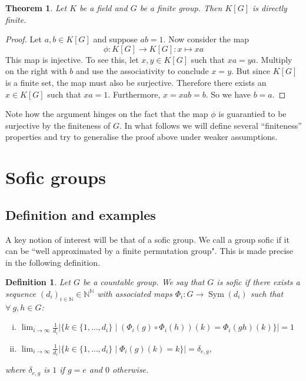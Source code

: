 \documentclass[titlepage, a4paper]{article}
\newcommand{\N}{\mathbb{N}}
\newcommand{\card}[1]{\left| #1 \right|}
\DeclareMathOperator{\sym}{Sym}
\newtheorem{theorem}{Theorem}
\newtheorem{definition}{Definition}
\theoremstyle{remark}
\begin{document}
\begin{theorem}
    Let $K$ be a field and $G$ be a finite group. Then $K[G]$ is directly finite.
\end{theorem}
\begin{proof}
    Let $a, b \in K[G]$ and suppose $ab=1$. Now consider the map
    \[
        \phi: K[G] \to K[G]: x \mapsto x a
    \]
    This map is injective. To see this, let $x, y \in K[G]$ such that $xa=ya$. Multiply on the right with $b$ and use the associativity to conclude $x=y$.
    But since $K[G]$ is a finite set, the map must also be surjective. Therefore there exists an $x \in K[G]$ such that $x a = 1$. Furthermore, $x = xab = b$. So we have $b=a$.
\end{proof}

Note how the argument hinges on the fact that the map $\phi$ is guarantied to be surjective by the finiteness of $G$. In what follows we will define several ``finiteness'' properties and try to generalise the proof above under weaker assumptions.

\section{Sofic groups}\label{sec:sofic_group}

\subsection{Definition and examples}

    A key notion of interest will be that of a sofic group. We call a group sofic if it can be ``well approximated by a finite permutation group". This is made precise in the following definition.

    \begin{definition}\label{def:Sofic}
        Let $G$ be a countable group. We say that $G$ is sofic if there exists a sequence $(d_i)_{i \in \N} \in \N ^{\N}$ with associated maps $\Phi_i : G \to \sym(d_i)$ such that $\forall\ g, h \in G$:
        \begin{enumerate}[(i)]
            \item $\displaystyle \lim_{i\to \infty} \frac{1}{d_i} \card{\big\{k \in \{1, \dots, d_i\} \mid (\Phi_i(g) \circ \Phi_i(h))(k) = \Phi_i(gh) (k) \big\}} = 1$
            \item $\displaystyle \lim_{i\to \infty} \frac{1}{d_i}  \card{\big\{k \in \{1, \dots, d_i\} \mid \Phi_i(g)(k) = k \big\}} = \delta_{e,g}$,
        \end{enumerate}
        where $\delta_{e,g}$ is $1$ if $g = e$ and $0$ otherwise.
    \end{definition}
\end{document}
